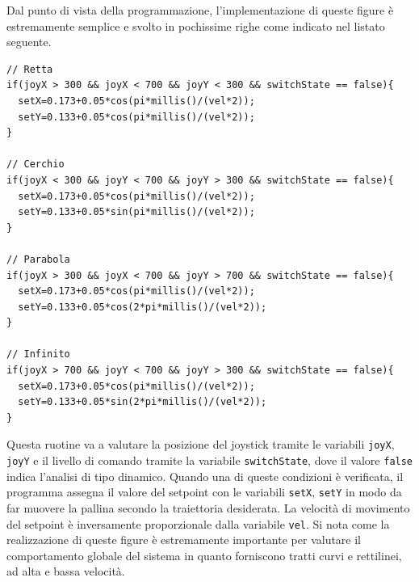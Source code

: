 \documentclass[12pt,twoside,openright]{report}
\begin{document}
Dal punto di vista della programmazione, l'implementazione di queste figure è estremamente semplice e svolto in pochissime righe come indicato nel listato seguente.
\begin{verbatim}
// Retta
if(joyX > 300 && joyX < 700 && joyY < 300 && switchState == false){
  setX=0.173+0.05*cos(pi*millis()/(vel*2));
  setY=0.133+0.05*cos(pi*millis()/(vel*2));
}

// Cerchio
if(joyX < 300 && joyY < 700 && joyY > 300 && switchState == false){
  setX=0.173+0.05*cos(pi*millis()/(vel*2));
  setY=0.133+0.05*sin(pi*millis()/(vel*2));
}

// Parabola
if(joyX > 300 && joyX < 700 && joyY > 700 && switchState == false){
  setX=0.173+0.05*cos(pi*millis()/(vel*2));
  setY=0.133+0.05*cos(2*pi*millis()/(vel*2));
}

// Infinito
if(joyX > 700 && joyY < 700 && joyY > 300 && switchState == false){
  setX=0.173+0.05*cos(pi*millis()/(vel*2));
  setY=0.133+0.05*sin(2*pi*millis()/(vel*2));
}
\end{verbatim}
Questa ruotine va a valutare la posizione del joystick tramite le variabili \texttt{joyX}, \texttt{joyY} e il livello di comando tramite la variabile \texttt{switchState}, dove il valore \texttt{false} indica l'analisi di tipo dinamico. Quando una di queste condizioni è verificata, il programma assegna il valore del setpoint con le variabili \texttt{setX}, \texttt{setY} in modo da far muovere la pallina secondo la traiettoria desiderata. La velocità di movimento del setpoint è inversamente proporzionale dalla variabile \texttt{vel}. Si nota come la realizzazione di queste figure è estremamente importante per valutare il comportamento globale del sistema in quanto forniscono tratti curvi e rettilinei, ad alta e bassa velocità.
\end{document}
